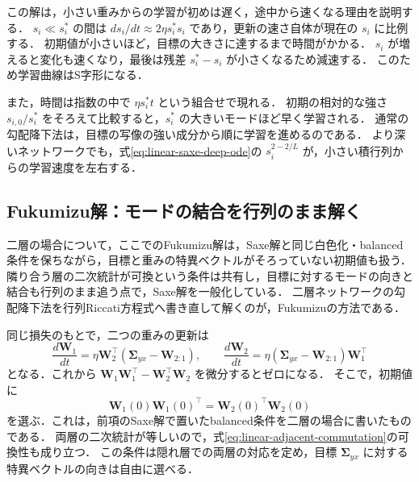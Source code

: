 \documentclass[../main.tex]{subfiles}
\begin{document}
この解は，小さい重みからの学習が初めは遅く，途中から速くなる理由を説明する．
$s_i\ll s_i^*$ の間は $ds_i/dt\approx2\eta s_i^* s_i$ であり，更新の速さ自体が現在の $s_i$ に比例する．
初期値が小さいほど，目標の大きさに達するまで時間がかかる．
$s_i$ が増えると変化も速くなり，最後は残差 $s_i^*-s_i$ が小さくなるため減速する．
このため学習曲線はS字形になる．

また，時間は指数の中で $\eta s_i^* t$ という組合せで現れる．
初期の相対的な強さ $s_{i,0}/s_i^*$ をそろえて比較すると，$s_i^*$ の大きいモードほど早く学習される．
通常の勾配降下法は，目標の写像の強い成分から順に学習を進めるのである．
より深いネットワークでも，式\eqref{eq:linear-saxe-deep-ode}の $s_i^{2-2/L}$ が，小さい積行列からの学習速度を左右する．

\subsection{Fukumizu解：モードの結合を行列のまま解く}

二層の場合について，ここでのFukumizu解は，Saxe解と同じ白色化・balanced条件を保ちながら，目標と重みの特異ベクトルがそろっていない初期値も扱う．
隣り合う層の二次統計が可換という条件は共有し，目標に対するモードの向きと結合も行列のまま追う点で，Saxe解を一般化している．
二層ネットワークの勾配降下法を行列Riccati方程式へ書き直して解くのが，Fukumizuの方法である\cite{fukumizu1998batch,braun2022exact}．

同じ損失のもとで，二つの重みの更新は
\begin{equation}
  \frac{d\bm{W}_1}{dt}
  =\eta\bm{W}_2^\top(\bm{\Sigma}_{yx}-\bm{W}_{2:1}),
  \qquad
  \frac{d\bm{W}_2}{dt}
  =\eta(\bm{\Sigma}_{yx}-\bm{W}_{2:1})\bm{W}_1^\top
  \label{eq:linear-fukumizu-weight-flow}
\end{equation}
となる．これから $\bm{W}_1\bm{W}_1^\top-\bm{W}_2^\top\bm{W}_2$ を微分するとゼロになる．
そこで，初期値に
\begin{equation}
  \bm{W}_1(0)\bm{W}_1(0)^\top
  =\bm{W}_2(0)^\top\bm{W}_2(0)
  \label{eq:linear-balanced-initialization}
\end{equation}
を選ぶ．これは，前項のSaxe解で置いたbalanced条件を二層の場合に書いたものである．
両層の二次統計が等しいので，式\eqref{eq:linear-adjacent-commutation}の可換性も成り立つ．
この条件は隠れ層での両層の対応を定め，目標 $\bm{\Sigma}_{yx}$ に対する特異ベクトルの向きは自由に選べる．
\end{document}
